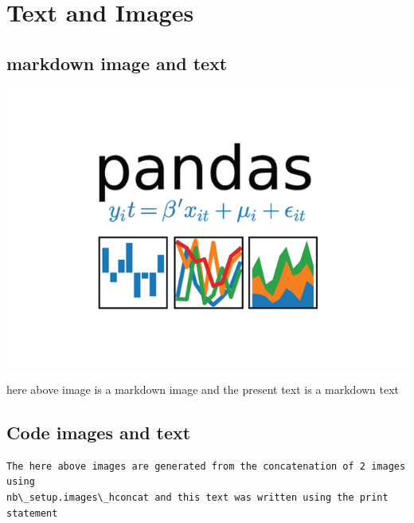 \documentclass[reprint, floatfix, groupaddress, prb]{article}
\newcommand{\prompt}[4]{
        \ttfamily\llap{{\color{#2}[#3]:\hspace{3pt}#4}}\vspace{-\baselineskip}
    }
\begin{document}
    

    \hypertarget{text-and-images}{%
\section{Text and Images}\label{text-and-images}}

    \hypertarget{markdown-image-and-text}{%
\subsection{markdown image and text}\label{markdown-image-and-text}}

    \includegraphics{pics/pandas_logo.png}

    here above image is a markdown image and the present text is a markdown
text

    \hypertarget{code-images-and-text}{%
\subsection{Code images and text}\label{code-images-and-text}}
 
            
\prompt{Out}{outcolor}{5}{}
    
    \begin{figure}
        \begin{center}\end{center}
        \caption{}
        \label{}
    \end{figure}
    

    \begin{Verbatim}[commandchars=\\\{\}]
 The here above images are generated from the concatenation of 2 images using
nb\_setup.images\_hconcat and this text was written using the print statement
    \end{Verbatim}
\end{document}
